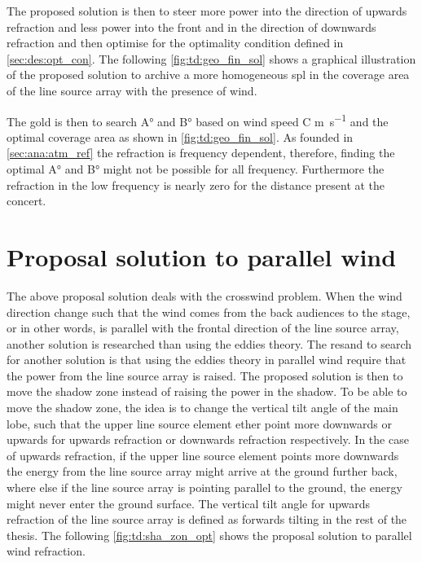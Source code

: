 The proposed solution is then to steer more power into the direction of upwards refraction and less power into the front and in the direction of downwards refraction and then optimise for the optimality condition defined in \autoref{sec:des:opt_con}. The following \autoref{fig:td:geo_fin_sol} shows a graphical illustration of the proposed solution to archive a more homogeneous \gls{spl} in the coverage area of the line source array with the presence of wind.


The gold is then to search A\si{\degree} and B\si{\degree} based on wind speed C \si{\meter\per\second} and the optimal coverage area as shown in \autoref{fig:td:geo_fin_sol}. As founded in \autoref{sec:ana:atm_ref} the refraction is frequency dependent, therefore, finding the optimal  A\si{\degree} and B\si{\degree} might not be possible for all frequency. Furthermore the refraction in the low frequency is nearly zero for the distance present at the concert.  


\section{Proposal solution to parallel wind}\label{sec:des:pro_para}
The above proposal solution deals with the crosswind problem. When the wind direction change such that the wind comes from the back audiences to the stage, or in other words, is parallel with the frontal direction of the line source array, another solution is researched than using the eddies theory. The resand to search for another solution is that using the eddies theory in parallel wind require that the power from the line source array is raised. The proposed solution is then to move the shadow zone instead of raising the power in the shadow. To be able to move the shadow zone, the idea is to change the vertical tilt angle of the main lobe, such that the upper line source element ether point more downwards or upwards for upwards refraction or downwards refraction respectively. In the case of upwards refraction, if the upper line source element points more downwards the energy from the line source array might arrive at the ground further back, where else if the line source array is pointing parallel to the ground, the energy might never enter the ground surface. The vertical tilt angle for upwards refraction of the line source array is defined as forwards tilting in the rest of the thesis. The following \autoref{fig:td:sha_zon_opt} shows the proposal solution to parallel wind refraction.  

